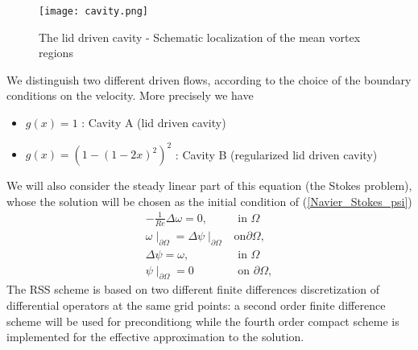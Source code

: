 \documentclass[11pt]{article}
\newcommand{\Frac}[2] {\frac{\textstyle #1} {\textstyle #2}}
\begin{document}
{\begin{figure}[h]
\begin{center}
\texttt{[image: cavity.png]}
\end{center}
\caption{The lid driven cavity - Schematic localization of the mean
vortex regions}
\end{figure}

We distinguish two different driven flows, according to the choice of
the boundary conditions on the velocity. More precisely we have
\begin{itemize}
\item $g(x)=1$ : Cavity A (lid driven cavity)
\item $g(x)=(1-(1-2x)^2)^2$ : Cavity B (regularized lid driven cavity)
\end{itemize}
We will also consider the steady  linear part of this equation (the Stokes problem), whose the solution will be chosen as the initial condition of (\ref{Navier_Stokes_psi})
\begin{eqnarray}
\label{Stokes_psi}
-\Frac {1}{Re}\Delta \omega=0, &\mbox{ in }  \Omega\\
\omega\mid_{\partial \Omega}=\Delta \psi \mid_{\partial \Omega} & \mbox{on} \partial \Omega,\\
\Delta \psi =\omega, &\mbox{ in } \Omega\\
\psi\mid_{\partial \Omega}=0 & \mbox{ on } \partial \Omega,
\end{eqnarray}
The RSS scheme is based on two different finite differences discretization of differential operators at the same grid points: a second order finite difference scheme will be used for preconditiong while the fourth order compact scheme is
implemented for the effective approximation to the solution.

}
\end{document}
